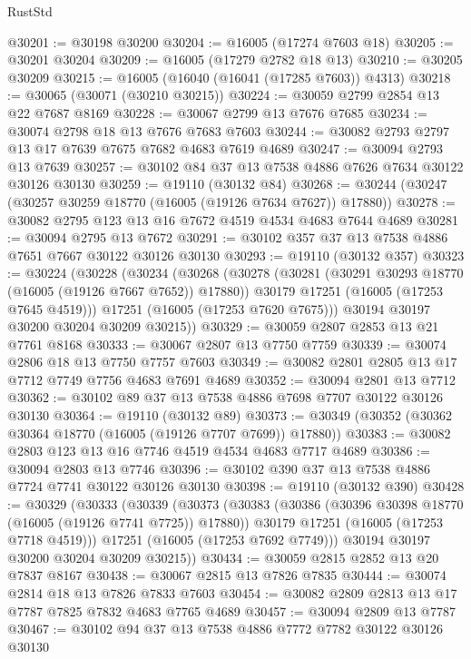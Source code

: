 \begin{lexlean}{RustStd}
\begin{coremodule}
@30201 := @30198 @30200
@30204 := @16005 (@17274 @7603 @18)
@30205 := @30201 @30204
@30209 := @16005 (@17279 @2782 @18 @13)
@30210 := @30205 @30209
@30215 := @16005 (@16040 (@16041 (@17285 @7603)) @4313)
@30218 := @30065 (@30071 (@30210 @30215))
@30224 := @30059 @2799 @2854 @13 @22 @7687 @8169
@30228 := @30067 @2799 @13 @7676 @7685
@30234 := @30074 @2798 @18 @13 @7676 @7683 @7603
@30244 := @30082 @2793 @2797 @13 @17 @7639 @7675 @7682 @4683 @7619 @4689
@30247 := @30094 @2793 @13 @7639
@30257 := @30102 @84 @37 @13 @7538 @4886 @7626 @7634 @30122 @30126 @30130
@30259 := @19110 (@30132 @84)
@30268 := @30244 (@30247 (@30257 @30259 @18770 (@16005 (@19126 @7634 @7627)) @17880))
@30278 := @30082 @2795 @123 @13 @16 @7672 @4519 @4534 @4683 @7644 @4689
@30281 := @30094 @2795 @13 @7672
@30291 := @30102 @357 @37 @13 @7538 @4886 @7651 @7667 @30122 @30126 @30130
@30293 := @19110 (@30132 @357)
@30323 := @30224
    (@30228
      (@30234
        (@30268
          (@30278
            (@30281 (@30291 @30293 @18770 (@16005 (@19126 @7667 @7652)) @17880))
            @30179
            @17251
            (@16005 (@17253 @7645 @4519)))
          @17251
          (@16005 (@17253 @7620 @7675)))
        @30194
        @30197
        @30200
        @30204
        @30209
        @30215))
@30329 := @30059 @2807 @2853 @13 @21 @7761 @8168
@30333 := @30067 @2807 @13 @7750 @7759
@30339 := @30074 @2806 @18 @13 @7750 @7757 @7603
@30349 := @30082 @2801 @2805 @13 @17 @7712 @7749 @7756 @4683 @7691 @4689
@30352 := @30094 @2801 @13 @7712
@30362 := @30102 @89 @37 @13 @7538 @4886 @7698 @7707 @30122 @30126 @30130
@30364 := @19110 (@30132 @89)
@30373 := @30349 (@30352 (@30362 @30364 @18770 (@16005 (@19126 @7707 @7699)) @17880))
@30383 := @30082 @2803 @123 @13 @16 @7746 @4519 @4534 @4683 @7717 @4689
@30386 := @30094 @2803 @13 @7746
@30396 := @30102 @390 @37 @13 @7538 @4886 @7724 @7741 @30122 @30126 @30130
@30398 := @19110 (@30132 @390)
@30428 := @30329
    (@30333
      (@30339
        (@30373
          (@30383
            (@30386 (@30396 @30398 @18770 (@16005 (@19126 @7741 @7725)) @17880))
            @30179
            @17251
            (@16005 (@17253 @7718 @4519)))
          @17251
          (@16005 (@17253 @7692 @7749)))
        @30194
        @30197
        @30200
        @30204
        @30209
        @30215))
@30434 := @30059 @2815 @2852 @13 @20 @7837 @8167
@30438 := @30067 @2815 @13 @7826 @7835
@30444 := @30074 @2814 @18 @13 @7826 @7833 @7603
@30454 := @30082 @2809 @2813 @13 @17 @7787 @7825 @7832 @4683 @7765 @4689
@30457 := @30094 @2809 @13 @7787
@30467 := @30102 @94 @37 @13 @7538 @4886 @7772 @7782 @30122 @30126 @30130

\end{coremodule}
\end{lexlean}
